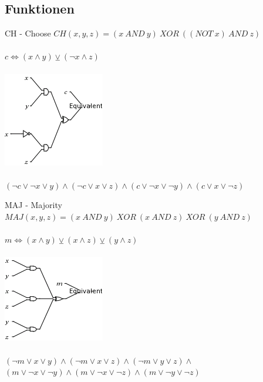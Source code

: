 \documentclass{beamer}
\begin{document}
  \subsection{Funktionen}
    \begin{frame}{CH - Choose}
      $ CH( x, y, z) = (x~AND~y)~XOR~( (NOT~x)~AND~z) $\\
      ~\\
      $ c \Leftrightarrow (x \wedge y) \veebar ( \neg x \wedge z) $\\
      ~\\
      \includegraphics[scale=0.5]{ch.png}\\
      ~\\
      $ (\neg c \vee \neg x \vee y) \wedge (\neg c \vee x \vee z) \wedge (c \vee \neg x \vee \neg y) \wedge (c \vee x \vee \neg z) $
    \end{frame}
    \begin{frame}{MAJ - Majority}
      $ MAJ( x, y, z) = (x~AND~y)~XOR~(x~AND~z)~XOR~(y~AND~z) $\\
      ~\\
      $ m \Leftrightarrow (x \wedge y) \veebar (x \wedge z) \veebar (y \wedge z) $\\
      ~\\
      \includegraphics[scale=0.5]{maj.png}\\
      ~\\
      $ (\neg m \vee x \vee y) \wedge  (\neg m \vee x \vee z) \wedge (\neg m \vee y \vee z) \wedge $\\
      $ (m \vee \neg x \vee \neg y) \wedge (m \vee \neg x \vee \neg z) \wedge (m \vee \neg y \vee \neg z) $
      \end{frame}
\end{document}
